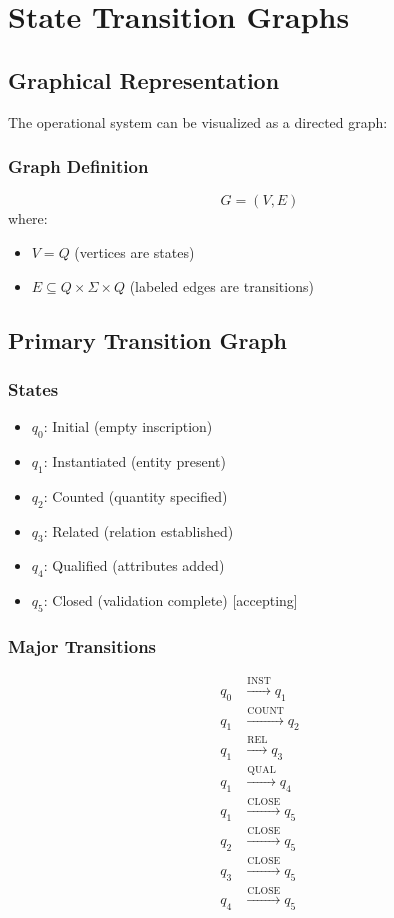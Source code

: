 \section{State Transition Graphs}

\subsection{Graphical Representation}

The operational system can be visualized as a directed graph:

\subsubsection{Graph Definition}
\[
G = (V, E)
\]
where:
\begin{itemize}
    \item $V = Q$ (vertices are states)
    \item $E \subseteq Q \times \Sigma \times Q$ (labeled edges are transitions)
\end{itemize}

\subsection{Primary Transition Graph}

\subsubsection{States}
\begin{itemize}
    \item $q_0$: Initial (empty inscription)
    \item $q_1$: Instantiated (entity present)
    \item $q_2$: Counted (quantity specified)
    \item $q_3$: Related (relation established)
    \item $q_4$: Qualified (attributes added)
    \item $q_5$: Closed (validation complete) [accepting]
\end{itemize}

\subsubsection{Major Transitions}
\begin{align*}
q_0 &\xrightarrow{\text{INST}} q_1 \\
q_1 &\xrightarrow{\text{COUNT}} q_2 \\
q_1 &\xrightarrow{\text{REL}} q_3 \\
q_1 &\xrightarrow{\text{QUAL}} q_4 \\
q_1 &\xrightarrow{\text{CLOSE}} q_5 \\
q_2 &\xrightarrow{\text{CLOSE}} q_5 \\
q_3 &\xrightarrow{\text{CLOSE}} q_5 \\
q_4 &\xrightarrow{\text{CLOSE}} q_5
\end{align*}

